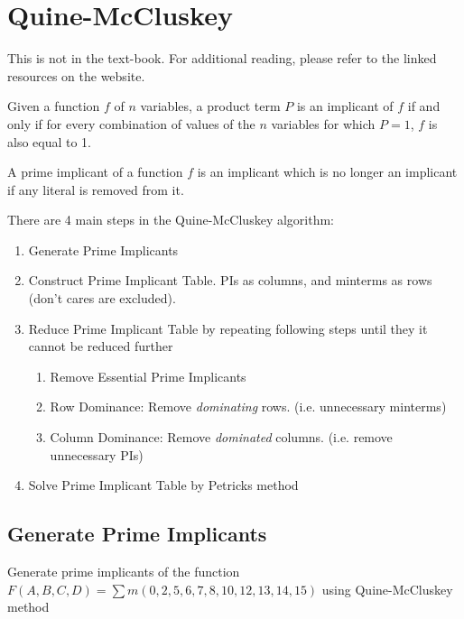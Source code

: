 \section{Quine-McCluskey}
This is not in the text-book. For additional reading, please refer to the linked
resources on the website.


\begin{definition}[Implicant]
  Given a function $f$ of $n$ variables, a product term $P$ is an implicant of $f$
  if and only if for every combination of values of the $n$ variables for which $P=1$, $f$ is
  also equal to 1.
\end{definition}

\begin{definition}
  A prime implicant of a function $f$ is an implicant which is no longer an
  implicant if any literal is removed from it.
\end{definition}

There are 4 main steps in the Quine-McCluskey algorithm:

\begin{enumerate}
\item Generate Prime Implicants
\item Construct Prime Implicant Table. PIs as columns, and minterms as
  rows (don't cares are excluded).
\item Reduce Prime Implicant Table by repeating following steps until they
  it cannot be reduced further
\begin{enumerate}
  \item Remove Essential Prime Implicants
  \item Row Dominance: Remove \emph{dominating} rows. (i.e. unnecessary minterms)
  \item Column Dominance: Remove \emph{dominated} columns. (i.e. remove unnecessary PIs)
\end{enumerate}
\item Solve Prime Implicant Table by Petricks method
\end{enumerate}


\subsection{Generate Prime Implicants}

\begin{example}
  Generate prime implicants of the function $F (A, B, C, D) = \sum m(0, 2, 5, 6, 7,
  8, 10, 12, 13, 14, 15)$  using Quine-McCluskey method
\end{example}
\vspace{20em}

